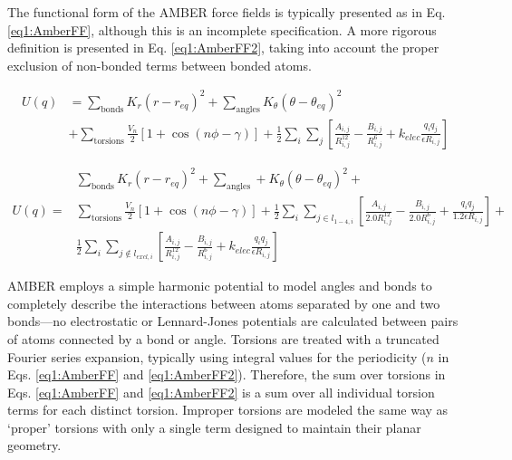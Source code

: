 The functional form of the AMBER force fields is typically presented as in Eq.
\ref{eq1:AmberFF}, \cite{Cornell_JAmChemSoc_1995_v117_p5179} although this is an
incomplete specification. A more rigorous definition is presented in Eq.
\ref{eq1:AmberFF2}, taking into account the proper exclusion of non-bonded terms
between bonded atoms.

\begin{align}
   U(q) & = \sum _ {\text{bonds}} K_r ( r - r_{eq}) ^ 2 + \sum _ {\text{angles}}
          K_{\theta} ( \theta - \theta _ {eq} ) ^ 2 \nonumber \\
      & + \sum _ {\text{torsions}} \frac {V_n} 2 \left [ 1 + \cos (n \phi -
          \gamma) \right ] + \frac 1 2 \sum _ {i} \sum _ {j} \left [ \frac
          {A_{i,j}} {R_{i,j} ^ {12}} - \frac {B_{i,j}} {R_{i,j} ^ 6} + k_{elec}
          \frac {q_i q_j} {\epsilon R_{i, j}} \right ]
   \label{eq1:AmberFF}
\end{align}

\begin{align}
    & \sum _ {\text{bonds}} K_r ( r - r_{eq}) ^ 2 + \sum _ {\text{angles}} +
          K_{\theta} ( \theta - \theta _ {eq} ) ^ 2 \nonumber + \\
   U(q) = & \sum _ {\text{torsions}} \frac {V_n} 2 \left [ 1 + \cos (n \phi -
      \gamma) \right ] + \frac 1 2 \sum _ {i} \sum _ {j \in l_{1-4,i}} \left [
      \frac {A_{i,j}} {2.0 R_{i,j} ^ {12}} - \frac {B_{i,j}} {2.0 R_{i,j} ^ 6} +
      \frac {q_i q_j} {1.2 \epsilon R _{i,j}} \right ] +
      \label{eq1:AmberFF2} \\
    & \frac 1 2 \sum _ {i} \sum _ {j \notin l_{excl,i}} \left [ \frac {A_{i,j}}
      {R_{i,j} ^ {12}} - \frac {B_{i,j}} {R_{i,j} ^ 6} + k_{elec} \frac {q_i
      q_j} {\epsilon R_{i, j}} \right ] \nonumber
\end{align}

AMBER employs a simple harmonic potential to model angles and bonds to
completely describe the interactions between atoms separated by one and two
bonds---\ie no electrostatic or Lennard-Jones potentials are calculated between
pairs of atoms connected by a bond or angle. Torsions are treated with a
truncated Fourier series expansion, typically using integral values for the
periodicity ($n$ in Eqs. \ref{eq1:AmberFF} and \ref{eq1:AmberFF2}). Therefore,
the sum over torsions in Eqs. \ref{eq1:AmberFF} and \ref{eq1:AmberFF2} is a sum
over all individual torsion terms for each distinct torsion. Improper torsions
are modeled the same way as `proper' torsions with only a single term designed
to maintain their planar geometry.

